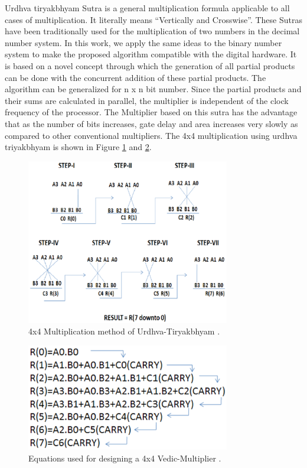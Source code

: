 Urdhva tiryakbhyam Sutra is a general multiplication formula applicable to all cases of multiplication. It literally means “Vertically and Crosswise”. These Sutras have been traditionally used for the multiplication of two numbers in the decimal number system. In this work, we apply the same ideas to the binary number system to make the proposed algorithm compatible with the digital hardware. It is based on a novel concept through which the generation of all partial products can be done with the concurrent addition of these partial products. The algorithm can be generalized for n x n bit number. Since the partial products and their sums are calculated in parallel, the multiplier is independent of the clock frequency of the processor. The Multiplier based on this sutra has the advantage that as the number of bits increases, gate delay and area increases very slowly as compared to other conventional multipliers. The 4x4 multiplication using urdhva triyakbhyam is shown in Figure \ref{lined} and \ref{eqa}.

\begin{figure}[h]
\begin{center}
\includegraphics[width=3.5in]{linedia.eps}
\caption{4x4 Multiplication method of Urdhva-Tiryakbhyam \cite{r8}.} \label{lined}
\end{center}
\end{figure}
\pagebreak

\begin{figure}[h]
\begin{center}
\includegraphics[width=3.5in]{equations.eps}
\caption{Equations used for designing a 4x4 Vedic-Multiplier \cite{r8}.} \label{eqa}
\end{center}
\end{figure}



